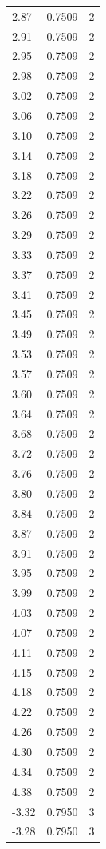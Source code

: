 \begin{longtable}{lrr}
  2.87 & 0.7509 & 2 \\
  2.91 & 0.7509 & 2 \\
  2.95 & 0.7509 & 2 \\
  2.98 & 0.7509 & 2 \\
  3.02 & 0.7509 & 2 \\
  3.06 & 0.7509 & 2 \\
  3.10 & 0.7509 & 2 \\
  3.14 & 0.7509 & 2 \\
  3.18 & 0.7509 & 2 \\
  3.22 & 0.7509 & 2 \\
  3.26 & 0.7509 & 2 \\
  3.29 & 0.7509 & 2 \\
  3.33 & 0.7509 & 2 \\
  3.37 & 0.7509 & 2 \\
  3.41 & 0.7509 & 2 \\
  3.45 & 0.7509 & 2 \\
  3.49 & 0.7509 & 2 \\
  3.53 & 0.7509 & 2 \\
  3.57 & 0.7509 & 2 \\
  3.60 & 0.7509 & 2 \\
  3.64 & 0.7509 & 2 \\
  3.68 & 0.7509 & 2 \\
  3.72 & 0.7509 & 2 \\
  3.76 & 0.7509 & 2 \\
  3.80 & 0.7509 & 2 \\
  3.84 & 0.7509 & 2 \\
  3.87 & 0.7509 & 2 \\
  3.91 & 0.7509 & 2 \\
  3.95 & 0.7509 & 2 \\
  3.99 & 0.7509 & 2 \\
  4.03 & 0.7509 & 2 \\
  4.07 & 0.7509 & 2 \\
  4.11 & 0.7509 & 2 \\
  4.15 & 0.7509 & 2 \\
  4.18 & 0.7509 & 2 \\
  4.22 & 0.7509 & 2 \\
  4.26 & 0.7509 & 2 \\
  4.30 & 0.7509 & 2 \\
  4.34 & 0.7509 & 2 \\
  4.38 & 0.7509 & 2 \\
  -3.32 & 0.7950 & 3 \\
  -3.28 & 0.7950 & 3 \\

\end{longtable}

